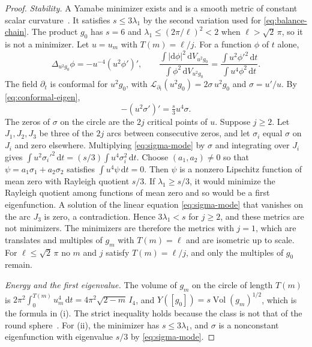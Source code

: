\documentclass[11pt]{article}
\numberwithin{equation}{section}
\DeclareMathOperator{\Vol}{Vol}
\newcommand{\dd}{\mathrm{d}}
\newcommand{\abs}[1]{\lvert #1\rvert}
\begin{document}
\begin{proof}
\emph{Stability.}
A Yamabe minimizer exists and is a smooth metric of constant scalar
curvature~\cite{LeeParker1987Yamabe,Schoen1984Yamabe}. It satisfies
\(s\le3\lambda_1\) by the second variation used for
\eqref{eq:balance-chain}. The product \(g_0\) has \(s=6\) and
\(\lambda_1\le(2\pi/\ell)^2<2\) when \(\ell>\sqrt2\,\pi\), so it is not
a minimizer. Let \(u=u_m\) with \(T(m)=\ell/j\). For a function
\(\phi\) of \(t\) alone,
\[
 \Delta_{u^2g_0}\phi=-u^{-4}(u^2\phi')',\qquad
 \frac{\int\abs{\dd\phi}^2\,\dd V_{u^2g_0}}{\int\phi^2\,\dd V_{u^2g_0}}
 =\frac{\int u^2\phi'^2\,\dd t}{\int u^4\phi^2\,\dd t}.
\]
The field \(\partial_t\) is conformal for \(u^2g_0\), with
\(\mathcal L_{\partial_t}(u^2g_0)=2\sigma\,u^2g_0\) and
\(\sigma=u'/u\). By \eqref{eq:conformal-eigen},
\begin{equation}\label{eq:sigma-mode}
 -(u^2\sigma')'=\tfrac{s}{3}u^4\sigma .
\end{equation}
The zeros of \(\sigma\) on the circle are the \(2j\) critical points
of \(u\). Suppose \(j\ge2\). Let \(J_1,J_2,J_3\) be three of the
\(2j\) arcs between consecutive zeros, and let \(\sigma_i\) equal
\(\sigma\) on \(J_i\) and zero elsewhere. Multiplying
\eqref{eq:sigma-mode} by \(\sigma\) and integrating over \(J_i\) gives
\(\int u^2\sigma_i'^2\,\dd t=(s/3)\int u^4\sigma_i^2\,\dd t\).
Choose \((a_1,a_2)\ne0\) so that \(\psi=a_1\sigma_1+a_2\sigma_2\)
satisfies \(\int u^4\psi\,\dd t=0\). Then \(\psi\) is a nonzero
Lipschitz function of mean zero with Rayleigh quotient \(s/3\). If
\(\lambda_1\ge s/3\), it would minimize the Rayleigh quotient among
functions of mean zero and so would be a first eigenfunction. A
solution of the linear equation \eqref{eq:sigma-mode} that vanishes on
the arc \(J_3\) is zero, a contradiction. Hence \(3\lambda_1<s\) for
\(j\ge2\), and these metrics are not minimizers. The minimizers are
therefore the metrics with \(j=1\), which are translates and multiples
of \(g_m\) with \(T(m)=\ell\) and are isometric up to scale. For
\(\ell\le\sqrt2\,\pi\) no \(m\) and \(j\) satisfy \(T(m)=\ell/j\), and
only the multiples of \(g_0\) remain.

\emph{Energy and the first eigenvalue.}
The volume of \(g_m\) on the circle of length \(T(m)\) is
\(2\pi^2\int_0^{T(m)}u_m^4\,\dd t=4\pi^2\sqrt{2-m}\,I_4\), and
\(Y([g_0])=s\Vol(g_m)^{1/2}\), which is the formula in (i). The
strict inequality holds because the class is not that of the round
sphere~\cite{LeeParker1987Yamabe,Schoen1984Yamabe}. For (ii), the
minimizer has \(s\le3\lambda_1\), and \(\sigma\) is a nonconstant
eigenfunction with eigenvalue \(s/3\) by \eqref{eq:sigma-mode}.


\end{proof}
\end{document}
